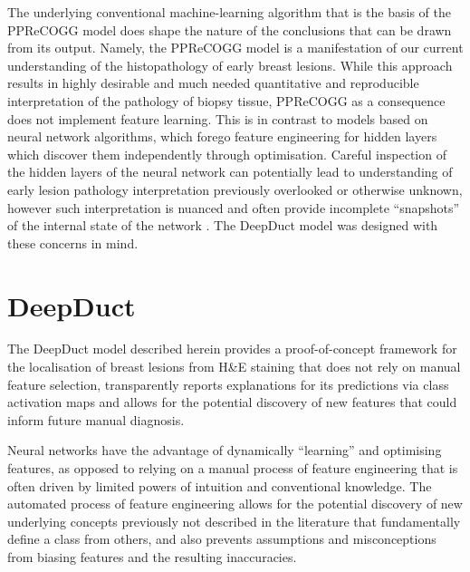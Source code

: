 The underlying conventional machine-learning algorithm that is the basis of the \mbox{PPReCOGG} model does shape the nature of the conclusions that can be drawn from its output. Namely, the PPReCOGG model is a manifestation of our current understanding of the histopathology of early breast lesions. While this approach results in highly desirable and much needed quantitative and reproducible interpretation of the pathology of biopsy tissue, PPReCOGG as a consequence does not implement feature learning. This is in contrast to models based on neural network algorithms, which forego feature engineering for hidden layers which discover them independently through optimisation. Careful inspection of the hidden layers of the neural network can potentially lead to understanding of early lesion pathology interpretation previously overlooked or otherwise unknown, however such interpretation is nuanced and often provide incomplete ``snapshots'' of the internal state of the network \citep{erhan2010, zeiler2013}. The DeepDuct model was designed with these concerns in mind.\par

\section{DeepDuct}

The DeepDuct model described herein provides a proof-of-concept framework for the localisation of breast lesions from H\&E staining that does not rely on manual feature selection, transparently reports explanations for its predictions via class activation maps and allows for the potential discovery of new features that could inform future manual diagnosis.\par

Neural networks have the advantage of dynamically ``learning'' and optimising features, as opposed to relying on a manual process of feature engineering that is often driven by limited powers of intuition and conventional knowledge. The automated process of feature engineering allows for the potential discovery of new underlying concepts previously not described in the literature that fundamentally define a class from others, and also prevents assumptions and misconceptions from biasing features and the resulting inaccuracies.\par

